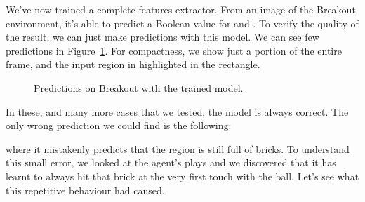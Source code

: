 We've now trained a complete features extractor. From an image of the Breakout
environment, it's able to predict a Boolean value for  and
. To verify the quality of the result, we can just make
predictions with this model. We can see few predictions in
Figure~\ref{fig:breakout-predict}. For compactness, we show just a portion of
the entire frame, and the input region in highlighted in the rectangle.
\begin{figure}
	\centering
	\caption{Predictions on Breakout with the trained model.}
	\label{fig:breakout-predict}
\end{figure}

In these, and many more cases that we tested, the model is always correct. The
only wrong prediction we could find is the following:
\begin{center}
\end{center}
where it mistakenly predicts that the region is still full of bricks. To
understand this small error, we looked at the agent's plays and we discovered
that it has learnt to always hit that brick at the very first touch with the
ball. Let's see what this repetitive behaviour had caused.

